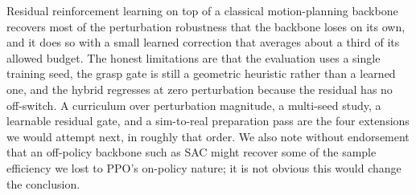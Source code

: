 \documentclass[letterpaper, 11 pt, journal, twoside]{IEEEtran}
\begin{document}
Residual reinforcement learning on top of a classical motion-planning backbone recovers most of the perturbation robustness that the backbone loses on its own, and it does so with a small learned correction that averages about a third of its allowed budget. The honest limitations are that the evaluation uses a single training seed, the grasp gate is still a geometric heuristic rather than a learned one, and the hybrid regresses at zero perturbation because the residual has no off-switch. A curriculum over perturbation magnitude, a multi-seed study, a learnable residual gate, and a sim-to-real preparation pass \cite{Tobin2017DomainRand} are the four extensions we would attempt next, in roughly that order. We also note without endorsement that an off-policy backbone such as SAC \cite{Haarnoja2018SAC} might recover some of the sample efficiency we lost to PPO's on-policy nature; it is not obvious this would change the conclusion.
\end{document}
